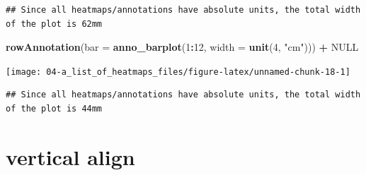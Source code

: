 \documentclass[]{book}
\newenvironment{Shaded}{\begin{snugshade}}{\end{snugshade}}
\newcommand{\KeywordTok}[1]{\textcolor[rgb]{0.13,0.29,0.53}{\textbf{#1}}}
\newcommand{\DataTypeTok}[1]{\textcolor[rgb]{0.13,0.29,0.53}{#1}}
\newcommand{\DecValTok}[1]{\textcolor[rgb]{0.00,0.00,0.81}{#1}}
\newcommand{\StringTok}[1]{\textcolor[rgb]{0.31,0.60,0.02}{#1}}
\newcommand{\OtherTok}[1]{\textcolor[rgb]{0.56,0.35,0.01}{#1}}
\newcommand{\OperatorTok}[1]{\textcolor[rgb]{0.81,0.36,0.00}{\textbf{#1}}}
\newcommand{\NormalTok}[1]{#1}
\theoremstyle{definition}
\theoremstyle{definition}
\theoremstyle{definition}
\theoremstyle{remark}
\begin{document}
\begin{verbatim}
## Since all heatmaps/annotations have absolute units, the total width of the plot is 62mm
\end{verbatim}

\begin{Shaded}
\begin{Highlighting}[]
\KeywordTok{rowAnnotation}\NormalTok{(}\DataTypeTok{bar =} \KeywordTok{anno_barplot}\NormalTok{(}\DecValTok{1}\OperatorTok{:}\DecValTok{12}\NormalTok{, }\DataTypeTok{width =} \KeywordTok{unit}\NormalTok{(}\DecValTok{4}\NormalTok{, }\StringTok{"cm"}\NormalTok{))) }\OperatorTok{+}\StringTok{ }\OtherTok{NULL}
\end{Highlighting}
\end{Shaded}

\begin{center}\texttt{[image: 04-a\_list\_of\_heatmaps\_files/figure-latex/unnamed-chunk-18-1]} \end{center}

\begin{verbatim}
## Since all heatmaps/annotations have absolute units, the total width of the plot is 44mm
\end{verbatim}

\section{vertical align}\label{vertical-align}

\begin{Shaded}
\end{Shaded}
\end{document}
